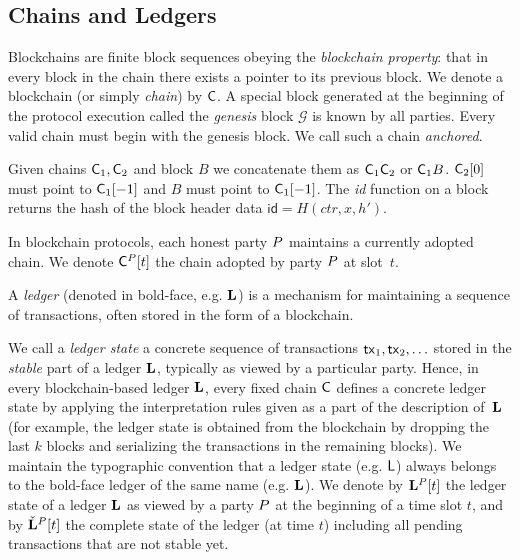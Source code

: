 \subsection{Chains and Ledgers}
Blockchains are finite block sequences obeying the \emph{blockchain property}:
that in every block in the chain there exists a pointer to its previous block.
We denote a blockchain (or simply \emph{chain}) by $\mathsf{C}$. A special block
generated at the beginning of the protocol execution called the \emph{genesis}
block $\mathcal{G}$ is known by all parties. Every valid chain must begin with
the genesis block. We call such a chain \emph{anchored}.

Given chains $\mathsf{C}_1, \mathsf{C}_2$ and block $B$ we concatenate them as
$\mathsf{C}_1 \mathsf{C}_2$ or $\mathsf{C}_1 B$. $\mathsf{C}_2[0]$ must point to $\mathsf{C}_1[-1]$
and $B$ must point to $\mathsf{C}_1[-1]$. The \emph{id} function on a block returns
the hash of the block header data $\textsf{id} = H(ctr, x,
h')$.

In blockchain protocols, each honest party $P$ maintains a currently
adopted chain. We denote $\mathsf{C}^{P}[t]$ the chain adopted by party $P$ at slot~$t$.

A \emph{ledger} (denoted in bold-face, e.g. $\mathbf{L}$) is a mechanism for
maintaining a sequence of transactions, often stored in the form of a
blockchain.

We call a \emph{ledger state}
a concrete sequence of transactions
$\mathsf{tx}_1,\mathsf{tx}_2, \ldots$ stored in the \emph{stable} part of a ledger $\mathbf{L}$, typically as viewed by a
particular party.
Hence, in every blockchain-based ledger $\mathbf{L}$, every fixed
chain $\mathsf{C}$ defines a concrete ledger state %
by applying  the interpretation rules given as a part of the description
of~$\mathbf{L}$ (for example, the ledger state is obtained from the
blockchain by dropping the last $k$ blocks and serializing the transactions in
the remaining blocks).
We maintain the typographic convention that a ledger state (e.g. $\mathsf{L}$) always
belongs to the bold-face ledger of the same name (e.g. $\mathbf{L}$).
We denote by $\mathbf{L}^{P}[t]$ the ledger state of a ledger $\mathbf{L}$ as viewed by a party
$P$ at the beginning of a time slot $t$,
and by $\check{\mathbf{L}}^P[t]$ the complete state of the ledger (at time
$t$) including all
pending transactions that are not stable yet.

